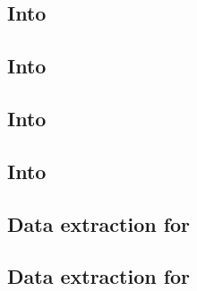 \subsection{Into \wcpMod{}                        \lispTodo{}}        \label{rlp auth: lookup: into wcp}                   
\subsection{Into \userTxnDataMod{}                \lispTodo{}}        \label{rlp auth: lookup: into txn data}              
\subsection{Into \btcMod{}                        \lispTodo{}}        \label{rlp auth: lookup: into block data}            
\subsection{Into \hubMod{}                        \lispTodo{}}        \label{rlp auth: lookup: into hub}                   
\subsection{Data extraction for      \lispTodo{}}        \label{rlp auth: lookup: extraction for keccak}      
\subsection{Data extraction for \macroEcrecover{} \lispTodo{}}        \label{rlp auth: lookup: extraction for ecrecover}   
